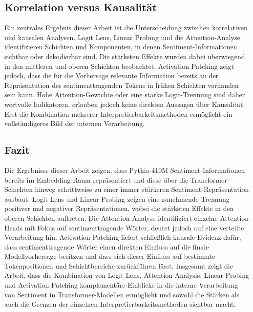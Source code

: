 \subsection{Korrelation versus Kausalität}

Ein zentrales Ergebnis dieser Arbeit ist die Unterscheidung zwischen korrelativen und kausalen Analysen. Logit Lens, Linear Probing und die Attention-Analyse identifizieren Schichten und Komponenten, in denen Sentiment-Informationen sichtbar oder dekodierbar sind. Die stärksten Effekte wurden dabei überwiegend in den mittleren und oberen Schichten beobachtet. Activation Patching zeigt jedoch, dass die für die Vorhersage relevante Information bereits an der Repräsentation des sentimenttragenden Tokens in frühen Schichten vorhanden sein kann. Hohe Attention-Gewichte oder eine starke Logit-Trennung sind daher wertvolle Indikatoren, erlauben jedoch keine direkten Aussagen über Kausalität. Erst die Kombination mehrerer Interpretierbarkeitsmethoden ermöglicht ein vollständigeres Bild der internen Verarbeitung.

\subsection{Fazit}

Die Ergebnisse dieser Arbeit zeigen, dass Pythia-410M Sentiment-Informationen bereits im Embedding-Raum repräsentiert und diese über die Transformer-Schichten hinweg schrittweise zu einer immer stärkeren Sentiment-Repräsentation ausbaut. Logit Lens und Linear Probing zeigen eine zunehmende Trennung positiver und negativer Repräsentationen, wobei die stärksten Effekte in den oberen Schichten auftreten. Die Attention-Analyse identifiziert einzelne Attention Heads mit Fokus auf sentimenttragende Wörter, deutet jedoch auf eine verteilte Verarbeitung hin. Activation Patching liefert schließlich kausale Evidenz dafür, dass sentimenttragende Wörter einen direkten Einfluss auf die finale Modellvorhersage besitzen und dass sich dieser Einfluss auf bestimmte Tokenpositionen und Schichtbereiche zurückführen lässt. Insgesamt zeigt die Arbeit, dass die Kombination von Logit Lens, Attention Analysis, Linear Probing und Activation Patching komplementäre Einblicke in die interne Verarbeitung von Sentiment in Transformer-Modellen ermöglicht und sowohl die Stärken als auch die Grenzen der einzelnen Interpretierbarkeitsmethoden sichtbar macht.